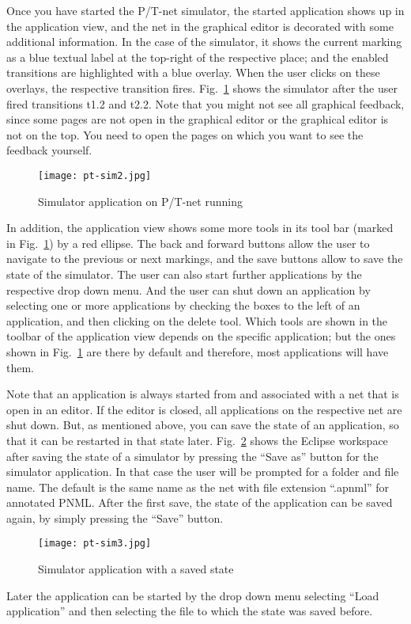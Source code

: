 Once you have started the P/T-net simulator, the started application shows
up in the application view, and the net in the graphical editor is decorated
with some additional information. In the case of the simulator, it shows
the current marking as a blue textual label at the top-right of the respective
place; and the enabled transitions are highlighted with a blue overlay.
When the user clicks on these overlays, the respective transition fires.
Fig.~\ref{fig:user:pt-sim2} shows the simulator after the user fired
transitions {\sf t1.2} and {\sf t2.2}. Note that you might not see all graphical
feedback, since some pages are not open in the graphical editor or the graphical
editor is not on the top. You need to open the pages on which you want to see
the feedback yourself.
%
\begin{figure}[hbt!!]
  \centerline{\texttt{[image: pt-sim2.jpg]}}
  \caption{Simulator application on P/T-net running}
  \label{fig:user:pt-sim2}
\end{figure}
%
In addition, the application view
shows some more tools in its tool bar (marked in Fig.~\ref{fig:user:pt-sim2})
by a red ellipse. The back and forward buttons allow the user to navigate
to the previous or next markings, and the save buttons allow to save the
state of the simulator. The user can also start further applications by
the respective drop down menu. And the user can shut down an application
by selecting one or more applications by checking the boxes to the left of
an application, and then clicking on the delete tool. Which tools are
shown in the toolbar of the application view depends on the specific
application; but the ones shown in Fig.~\ref{fig:user:pt-sim2} are there
by default and therefore, most applications will have them.

Note that an application is always started from and associated with a net
that is open in an editor. If the editor is closed, all applications on
the respective net are shut down. But, as mentioned above, you can save
the state of an application, so that it can be restarted in that state later.
Fig.~\ref{fig:user:pt-sim3} shows the Eclipse workspace after saving the
state of a simulator by pressing the ``Save as'' button for the simulator
application. In that case the user will be prompted for a folder and file name.
The default is the same name as the net with file extension ``.apnml'' for
annotated PNML. After the first save, the state of the application can be
saved again, by simply pressing the ``Save'' button. 
%
\begin{figure}[hbt!!]
  \centerline{\texttt{[image: pt-sim3.jpg]}}
  \caption{Simulator application with a saved state}
  \label{fig:user:pt-sim3}
\end{figure}
%
Later the application can be started by the drop down menu selecting
``Load application'' and then selecting the file to which the state was saved
before.

